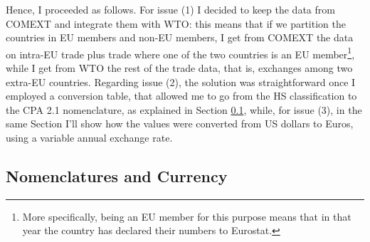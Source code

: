 Hence, I proceeded as follows. For issue (1) I decided to keep the data from COMEXT and integrate them with WTO: this means that if we partition the countries in EU members and non-EU members, I get from COMEXT the data on intra-EU trade plus trade where one of the two countries is an EU member\footnote{More specifically, being an EU member for this purpose means that in that year the country has declared their numbers to Eurostat.}, while I get from WTO the rest of the trade data, that is, exchanges among two extra-EU countries.
Regarding issue (2), the solution was straightforward once I employed a conversion table, that allowed me to go from the HS classification to the CPA 2.1 nomenclature, as explained in Section \ref{sec:nomandusd}, while, for issue (3), in the same Section I'll show how the values were converted from US dollars to Euros, using a variable annual exchange rate.


\subsection{Nomenclatures and Currency}\label{sec:nomandusd}

